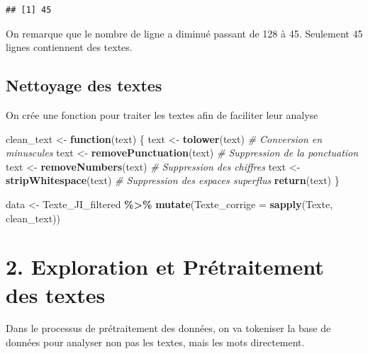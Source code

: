 \documentclass[
]{article}
\newenvironment{Shaded}{\begin{snugshade}}{\end{snugshade}}
\newcommand{\AttributeTok}[1]{\textcolor[rgb]{0.13,0.29,0.53}{#1}}
\newcommand{\CommentTok}[1]{\textcolor[rgb]{0.56,0.35,0.01}{\textit{#1}}}
\newcommand{\ControlFlowTok}[1]{\textcolor[rgb]{0.13,0.29,0.53}{\textbf{#1}}}
\newcommand{\FunctionTok}[1]{\textcolor[rgb]{0.13,0.29,0.53}{\textbf{#1}}}
\newcommand{\NormalTok}[1]{#1}
\newcommand{\OtherTok}[1]{\textcolor[rgb]{0.56,0.35,0.01}{#1}}
\newcommand{\SpecialCharTok}[1]{\textcolor[rgb]{0.81,0.36,0.00}{\textbf{#1}}}
\begin{document}
\begin{verbatim}
## [1] 45
\end{verbatim}

On remarque que le nombre de ligne a diminué passant de 128 à 45.
Seulement 45 lignes contiennent des textes.

\subsection{Nettoyage des textes}\label{nettoyage-des-textes}

On crée une fonction pour traiter les textes afin de faciliter leur
analyse

\begin{Shaded}
\begin{Highlighting}[]
\NormalTok{clean\_text }\OtherTok{\textless{}{-}} \ControlFlowTok{function}\NormalTok{(text) \{}
\NormalTok{  text }\OtherTok{\textless{}{-}} \FunctionTok{tolower}\NormalTok{(text)           }\CommentTok{\# Conversion en minuscules}
\NormalTok{  text }\OtherTok{\textless{}{-}} \FunctionTok{removePunctuation}\NormalTok{(text) }\CommentTok{\# Suppression de la ponctuation}
\NormalTok{  text }\OtherTok{\textless{}{-}} \FunctionTok{removeNumbers}\NormalTok{(text)     }\CommentTok{\# Suppression des chiffres}
\NormalTok{  text }\OtherTok{\textless{}{-}} \FunctionTok{stripWhitespace}\NormalTok{(text)   }\CommentTok{\# Suppression des espaces superflus}
  \FunctionTok{return}\NormalTok{(text)}
\NormalTok{\}}

\NormalTok{data }\OtherTok{\textless{}{-}}\NormalTok{ Texte\_JI\_filtered }\SpecialCharTok{\%\textgreater{}\%}
  \FunctionTok{mutate}\NormalTok{(}\AttributeTok{Texte\_corrige =} \FunctionTok{sapply}\NormalTok{(Texte, clean\_text))}
\end{Highlighting}
\end{Shaded}

\section{2. Exploration et Prétraitement des textes}\label{sec:importation}

Dans le processus de prétraitement des données, on va tokeniser la base
de données pour analyser non pas les textes, mais les mots directement.
\end{document}
